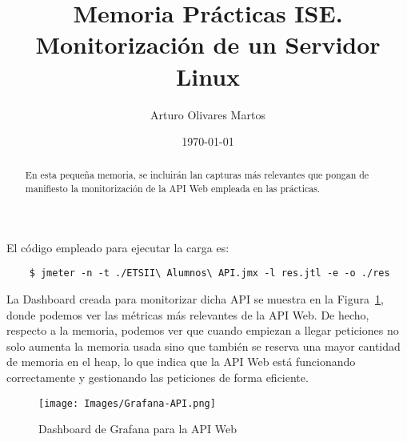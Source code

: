 \documentclass[a4paper,12pt]{article}
\title{Memoria Prácticas ISE.\\Monitorización de un Servidor Linux}
\author{Arturo Olivares Martos}
\date{\today}
\begin{document}
\maketitle

\begin{abstract}
    En esta pequeña memoria, se incluirán lan capturas más relevantes que pongan de manifiesto la monitorización de la API Web empleada en las prácticas.
\end{abstract}


\newpage

El código empleado para ejecutar la carga es:
\begin{verbatim}
    $ jmeter -n -t ./ETSII\ Alumnos\ API.jmx -l res.jtl -e -o ./res
\end{verbatim}

La Dashboard creada para monitorizar dicha API se muestra en la Figura~\ref{fig:Grafana-API}, donde podemos ver las métricas más relevantes de la API Web. De hecho, respecto a la memoria, podemos ver que cuando empiezan a llegar peticiones no solo aumenta la memoria usada sino que también se reserva una mayor cantidad de memoria en el heap, lo que indica que la API Web está funcionando correctamente y gestionando las peticiones de forma eficiente.
\begin{figure}[h]
    \centering
    \texttt{[image: Images/Grafana-API.png]}
    \caption{Dashboard de Grafana para la API Web}
    \label{fig:Grafana-API}
\end{figure}
\end{document}
